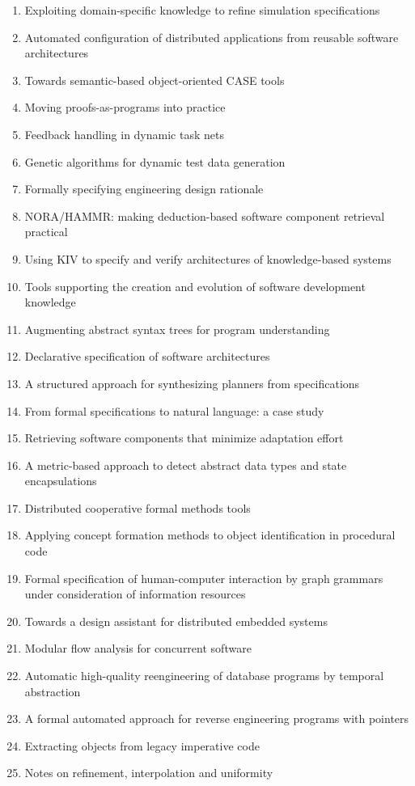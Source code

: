 \begin{enumerate}[itemsep=-1ex]
  \item Exploiting domain-specific knowledge to refine simulation specifications
  \item Automated configuration of distributed applications from reusable software architectures
  \item Towards semantic-based object-oriented CASE tools
  \item Moving proofs-as-programs into practice
  \item Feedback handling in dynamic task nets
  \item Genetic algorithms for dynamic test data generation
  \item Formally specifying engineering design rationale
  \item NORA/HAMMR: making deduction-based software component retrieval practical
  \item Using KIV to specify and verify architectures of knowledge-based systems
  \item Tools supporting the creation and evolution of software development knowledge
  \item Augmenting abstract syntax trees for program understanding
  \item Declarative specification of software architectures
  \item A structured approach for synthesizing planners from specifications
  \item From formal specifications to natural language: a case study
  \item Retrieving software components that minimize adaptation effort
  \item A metric-based approach to detect abstract data types and state encapsulations
  \item Distributed cooperative formal methods tools
  \item Applying concept formation methods to object identification in procedural code
  \item Formal specification of human-computer interaction by graph grammars under consideration of information resources
  \item Towards a design assistant for distributed embedded systems
  \item Modular flow analysis for concurrent software
  \item Automatic high-quality reengineering of database programs by temporal abstraction
  \item A formal automated approach for reverse engineering programs with pointers
  \item Extracting objects from legacy imperative code
  \item Notes on refinement, interpolation and uniformity
\end{enumerate}

